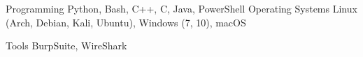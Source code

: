 

\begin{cvskills}

  \cvskill
    {Programming} %
    {Python, Bash, C++, C, Java, PowerShell} %
  \cvskill
    {Operating Systems} %
    {Linux (Arch, Debian, Kali, Ubuntu), Windows (7, 10), macOS} %

\cvskill
  {Tools} %
  {BurpSuite, WireShark} %
\end{cvskills}
